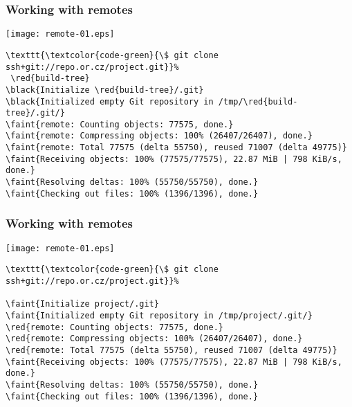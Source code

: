 \documentclass[english]{beamer}
\newcommand{\CMD}[1]{%
\texttt{\textcolor{code-green}{#1}}%
}
\newcommand{\black}[1]{%
\textcolor{code-black}{#1}%
}
\newcommand{\faint}[1]{%
\textcolor{code-gray}{#1}%
}
\newcommand{\red}[1]{%
\textcolor{code-red}{#1}%
}
\begin{document}
\begin{frame}[fragile]
\frametitle{Working with remotes}

\texttt{[image: remote-01.eps]}

{\tiny
\begin{Verbatim}[commandchars=\\\{\}]
\CMD{\$ git clone ssh+git://repo.or.cz/project.git} \red{build-tree}
\black{Initialize \red{build-tree}/.git}
\black{Initialized empty Git repository in /tmp/\red{build-tree}/.git/}
\faint{remote: Counting objects: 77575, done.}
\faint{remote: Compressing objects: 100% (26407/26407), done.}
\faint{remote: Total 77575 (delta 55750), reused 71007 (delta 49775)}
\faint{Receiving objects: 100% (77575/77575), 22.87 MiB | 798 KiB/s, done.}
\faint{Resolving deltas: 100% (55750/55750), done.}
\faint{Checking out files: 100% (1396/1396), done.}
\end{Verbatim}
}
\vspace{\textheight}
\end{frame}

\begin{frame}[fragile]
\frametitle{Working with remotes}

\texttt{[image: remote-01.eps]}

{\tiny
\begin{Verbatim}[commandchars=\\\{\}]
\CMD{\$ git clone ssh+git://repo.or.cz/project.git}
\faint{Initialize project/.git}
\faint{Initialized empty Git repository in /tmp/project/.git/}
\red{remote: Counting objects: 77575, done.}
\red{remote: Compressing objects: 100% (26407/26407), done.}
\red{remote: Total 77575 (delta 55750), reused 71007 (delta 49775)}
\faint{Receiving objects: 100% (77575/77575), 22.87 MiB | 798 KiB/s, done.}
\faint{Resolving deltas: 100% (55750/55750), done.}
\faint{Checking out files: 100% (1396/1396), done.}
\end{Verbatim}
}
\vspace{\textheight}
\end{frame}
\end{document}
